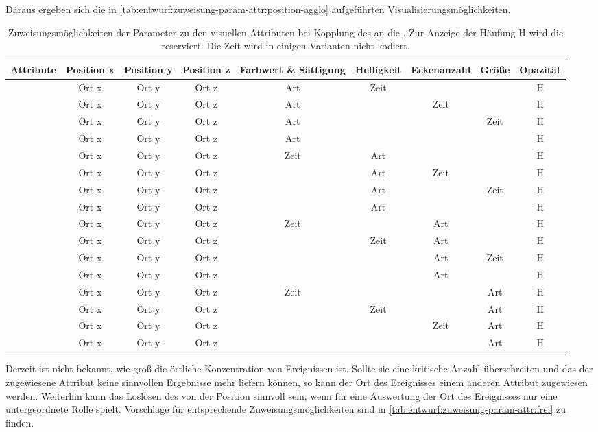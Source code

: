 Daraus ergeben sich die in \autoref{tab:entwurf:zuweisung-param-attr:position-agglo} aufgeführten Visualisierungsmöglichkeiten.

\begin{table} 
	\begin{tabularx}{\textwidth}{@{}CCCCCCCCC@{}}
		\toprule
		Attribute & Position x & Position y & Position z & Farbwert \& Sättigung & Helligkeit & Eckenanzahl & Größe & Opazität \tabularnewline
		\midrule
		& Ort x & Ort y & Ort z & Art & Zeit & & & H \tabularnewline
		& Ort x & Ort y & Ort z & Art & & Zeit & & H \tabularnewline 
		& Ort x & Ort y & Ort z & Art & & & Zeit & H \tabularnewline 
		& Ort x & Ort y & Ort z & Art & & & & H \tabularnewline 
		\midrule
		& Ort x & Ort y & Ort z & Zeit & Art & & & H \tabularnewline 
		& Ort x & Ort y & Ort z & & Art & Zeit & & H \tabularnewline
		& Ort x & Ort y & Ort z & & Art & & Zeit & H \tabularnewline 
		& Ort x & Ort y & Ort z & & Art & & & H \tabularnewline 
		\midrule
		& Ort x & Ort y & Ort z & Zeit & & Art & & H \tabularnewline 
		& Ort x & Ort y & Ort z & & Zeit & Art & & H \tabularnewline 
		& Ort x & Ort y & Ort z & & & Art & Zeit & H  \tabularnewline
		& Ort x & Ort y & Ort z & & & Art & & H  \tabularnewline
		\midrule
		& Ort x & Ort y & Ort z & Zeit & & & Art & H \tabularnewline 
		& Ort x & Ort y & Ort z & & Zeit & & Art & H \tabularnewline 
		& Ort x & Ort y & Ort z & & & Zeit & Art & H \tabularnewline 
		& Ort x & Ort y & Ort z & & & & Art & H \tabularnewline 
		\bottomrule
	\end{tabularx}
	\caption{Zuweisungsmöglichkeiten der Parameter zu den visuellen Attributen bei Kopplung des  an die . Zur Anzeige der Häufung H wird die  reserviert. Die Zeit wird in einigen Varianten nicht kodiert.}\label{tab:entwurf:zuweisung-param-attr:position-agglo}
\end{table}

Derzeit ist nicht bekannt, wie groß die örtliche Konzentration von Ereignissen ist. Sollte sie eine kritische Anzahl überschreiten und das der  zugewiesene Attribut keine sinnvollen Ergebnisse mehr liefern können, so kann der Ort des Ereignisses einem anderen Attribut zugewiesen werden. Weiterhin kann das Loslösen des  von der Position sinnvoll sein, wenn für eine Auswertung der Ort des Ereignisses nur eine untergeordnete Rolle spielt. Vorschläge für entsprechende Zuweisungsmöglichkeiten sind in \autoref{tab:entwurf:zuweisung-param-attr:frei} zu finden.

